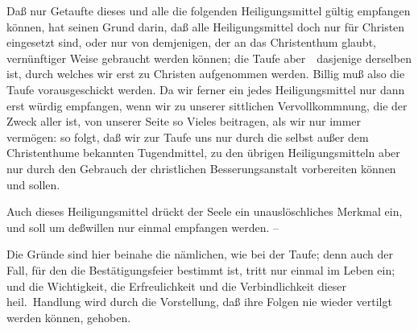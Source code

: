 \begin{aufza}
\par
Daß nur Getaufte dieses und alle die folgenden Heiligungsmittel gültig empfangen können, hat seinen Grund darin, daß alle Heiligungsmittel doch nur für Christen eingesetzt sind, oder nur von demjenigen, der an das Christenthum glaubt, vernünftiger Weise gebraucht werden können; die Taufe aber~\ dasjenige derselben ist, durch welches wir erst zu Christen aufgenommen werden. Billig muß also die Taufe vorausgeschickt werden. Da wir ferner ein jedes Heiligungsmittel nur dann erst würdig empfangen, wenn wir zu unserer sittlichen Vervollkommnung, die der Zweck aller ist, von unserer Seite so Vieles beitragen, als wir nur immer vermögen: so folgt, daß wir zur Taufe uns nur durch die selbst außer dem Christenthume bekannten Tugendmittel, zu den übrigen Heiligungsmitteln aber nur durch den Gebrauch der christlichen Besserungsanstalt vorbereiten können und sollen.
\item Auch dieses Heiligungsmittel drückt der Seele ein unauslöschliches Merkmal ein, und soll um deßwillen nur einmal empfangen werden. --\par
{}\par
Die Gründe sind hier beinahe die nämlichen, wie bei der Taufe; denn auch der Fall, für den die Bestätigungsfeier bestimmt ist, tritt nur einmal im Leben ein; und die Wichtigkeit, die Erfreulichkeit und die Verbindlichkeit dieser heil.\ Handlung wird durch die Vorstellung, daß ihre Folgen nie wieder vertilgt werden können, gehoben.
\end{aufza}

